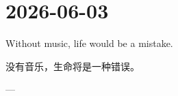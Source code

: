 \section*{2026-06-03}
Without music, life would be a mistake.\par
没有音乐，生命将是一种错误。 \par
\hfill ---  \par
